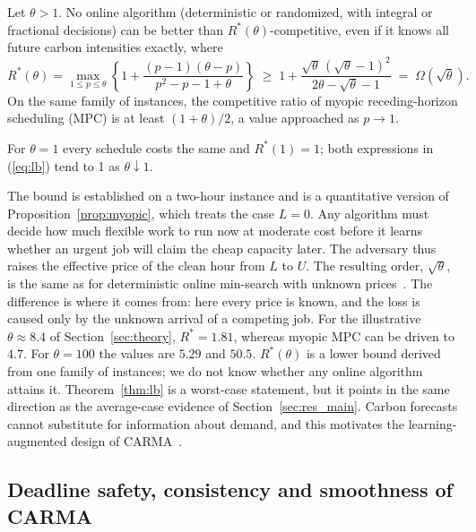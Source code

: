 \begin{theorem}\label{thm:lb}
Let $\theta>1$. No online algorithm (deterministic or randomized, with integral or fractional decisions) can be better than $R^*(\theta)$-competitive, even if it knows all future carbon intensities exactly, where
\begin{equation}\label{eq:lb}
R^*(\theta)=\max_{1\le p\le\theta}\left\{1+\frac{(p-1)(\theta-p)}{p^2-p-1+\theta}\right\}\;\ge\;1+\frac{\sqrt\theta\,(\sqrt\theta-1)^2}{2\theta-\sqrt\theta-1}\;=\;\Omega(\sqrt{\theta}).
\end{equation}
On the same family of instances, the competitive ratio of myopic receding-horizon scheduling (MPC) is at least $(1+\theta)/2$, a value approached as $p\to 1$.
\end{theorem}
For $\theta=1$ every schedule costs the same and $R^*(1)=1$; both expressions in (\ref{eq:lb}) tend to 1 as $\theta\downarrow 1$.

The bound is established on a two-hour instance and is a quantitative version of Proposition~\ref{prop:myopic}, which treats the case $L=0$. Any algorithm must decide how much flexible work to run now at moderate cost before it learns whether an urgent job will claim the cheap capacity later. The adversary thus raises the effective price of the clean hour from $L$ to $U$. The resulting order, $\sqrt\theta$, is the same as for deterministic online min-search with unknown prices~\cite{elyaniv2001optimal}. The difference is where it comes from: here every price is known, and the loss is caused only by the unknown arrival of a competing job. For the illustrative $\theta\approx 8.4$ of Section~\ref{sec:theory}, $R^*=1.81$, whereas myopic MPC can be driven to $4.7$. For $\theta=100$ the values are $5.29$ and $50.5$. $R^*(\theta)$ is a lower bound derived from one family of instances; we do not know whether any online algorithm attains it. Theorem~\ref{thm:lb} is a worst-case statement, but it points in the same direction as the average-case evidence of Section~\ref{sec:res_main}. Carbon forecasts cannot substitute for information about demand, and this motivates the learning-augmented design of CARMA~\cite{lykouris2021competitive}.

\subsection{Deadline safety, consistency and smoothness of CARMA}\label{sec:guarantees}

